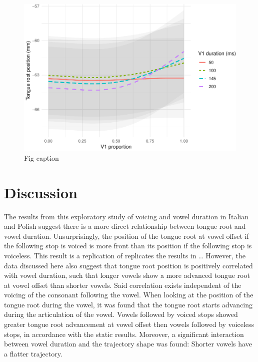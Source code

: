 \documentclass[12pt,]{article}
\begin{document}
\begin{figure}
\includegraphics[width=\linewidth]{2018-tra_files/figure-latex/tra-gam-2-plot-1} \caption{Fig caption}\label{f:tra-gam-2-plot}
\end{figure}

\hypertarget{discussion}{%
\section{Discussion}\label{discussion}}

\label{s:discussion}

The results from this exploratory study of voicing and vowel duration in
Italian and Polish suggest there is a more direct relationship between
tongue root and vowel duration. Unsurprisingly, the position of the
tongue root at vowel offset if the following stop is voiced is more
front than its position if the following stop is voiceless. This result
is a replication of replicates the results in \ldots{} However, the data
discussed here also suggest that tongue root position is positively
correlated with vowel duration, such that longer vowels show a more
advanced tongue root at vowel offset than shorter vowels. Said
correlation exists independent of the voicing of the consonant following
the vowel. When looking at the position of the tongue root during the
vowel, it was found that the tongue root starts advancing during the
articulation of the vowel. Vowels followed by voiced stops showed
greater tongue root advancement at vowel offset then vowels followed by
voiceless stops, in accordance with the static results. Moreover, a
significant interaction between vowel duration and the trajectory shape
was found: Shorter vowels have a flatter trajectory.
\end{document}
